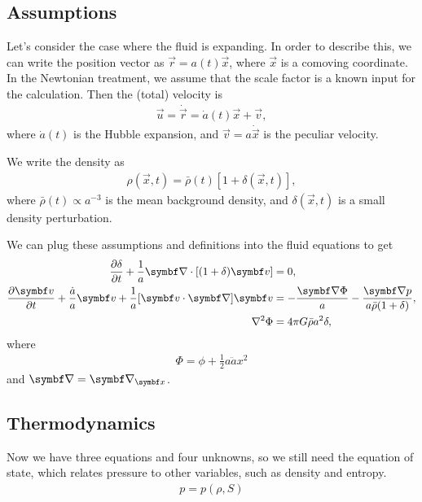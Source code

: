 \subsection{Assumptions}

Let's consider the case where the fluid is expanding. In order to describe this, we can write the position vector as $\vec{r} = a(t) \vec{x}$, where $\vec{x}$ is a comoving coordinate. In the Newtonian treatment, we assume that the scale factor is a known input for the calculation. Then the (total) velocity is
\begin{align*}
	\vec{u} = \dot{\vec{r}} = \dot{a}(t) \vec{x} + \vec{v},
\end{align*}
where $\dot{a}(t)$ is the Hubble expansion, and $\vec{v} = a \dot{\vec{x}}$ is the peculiar velocity.

We write the density as
\begin{align*}
	\rho(\vec{x},t) = \bar{\rho}(t) [1 + \delta(\vec{x}, t)],
\end{align*}
where $\bar{\rho}(t) \propto a^{-3}$ is the mean background density, and $\delta(\vec{x}, t)$ is a small density perturbation.

We can plug these assumptions and definitions into the fluid equations to get
\begin{align*}
	\pdv{\delta}{t} + \frac{1}{a} \Div[(1+\delta)\vec{v}]
	&= 0,\\
	\pdv{\vec{v}}{t} + \frac{\dot{a}}{a} \vec{v} + \frac{1}{a} [\vec{v} \cdot \Grad] \vec{v}
	&= - \frac{\Grad \Phi}{a} - \frac{\Grad p}{a \bar{\rho}(1+\delta)},\\
	\Lap \Phi
	&= 4 \pi G \bar{\rho} a^2 \delta,
\end{align*}
where
\begin{align*}
	\Phi = \phi + \frac{1}{2} a \ddot{a} x^2 
\end{align*}
and $\Grad = \Grad_{\vec{x}}$.

\subsection{Thermodynamics}

Now we have three equations and four unknowns, so we still need the equation of state, which relates pressure to other variables, such as density and entropy. 
\begin{align*}
	p = p(\rho, S)
\end{align*}

